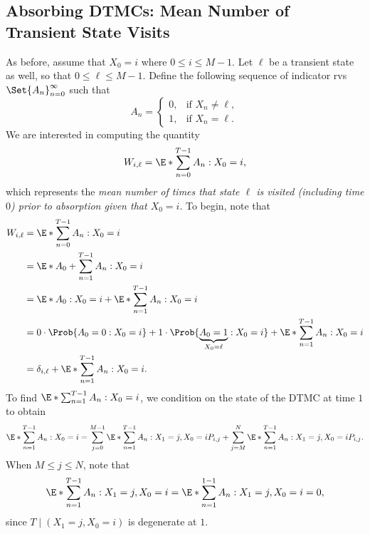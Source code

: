\subsection*{Absorbing DTMCs: Mean Number of Transient State Visits}
\begin{Regular}
    As before, assume that $X_{0}=i$ where $0 \leq i \leq M-1$. Let $\ell$ be a transient state as well, so that $0 \leq \ell \leq M-1$.
    Define the following sequence of indicator rvs $ \Set{A_n}_{n=0}^\infty $ such that
    \[ A_{n}= \begin{cases}
            0, & \text{if $X_{n} \neq \ell$}, \\
            1, & \text{if $X_{n}=\ell$}.
        \end{cases} \]
    We are interested in computing the quantity
    \[ W_{i,\ell}=\E*{\sum_{n=0}^{T-1} A_n\given X_0=i}, \]
    which represents the \emph{mean number of times that state $ \ell $ is visited (including time $0$) prior to
        absorption given that $ X_0=i $}. To begin, note that
    \begin{align*}
        W_{i, \ell}
         & =\E*{\sum_{n=0}^{T-1} A_{n} \given X_{0}=i}                                                                                                       \\
         & =\E*{A_{0}+\sum_{n=1}^{T-1} A_{n} \given X_{0}=i}                                                                                                 \\
         & =\E*{A_{0} \given X_{0}=i}+\E*{\sum_{n=1}^{T-1} A_{n} \given X_{0}=i}                                                                             \\
         & =0 \cdot \Prob{A_{0}=0 \given X_{0}=i}+1 \cdot \Prob{\underbrace{A_{0}=1}_{X_{0}=\ell} \given X_{0}=i}+\E*{\sum_{n=1}^{T-1} A_{n} \given X_{0}=i} \\
         & =\delta_{i, \ell}+\E*{\sum_{n=1}^{T-1} A_{n} \given X_{0}=i} .
    \end{align*}
    To find $\E*{\sum_{n=1}^{T-1} A_{n} \given X_{0}=i}$, we condition on the state of the DTMC at time $1$ to obtain
    \[
        \E*{\sum_{n=1}^{T-1} A_{n} \given X_{0}=i}
        =\sum_{j=0}^{M-1} \E*{\sum_{n=1}^{T-1} A_{n} \given X_{1}=j, X_{0}=i} P_{i, j}
        +\sum_{j=M}^{N} \E*{\sum_{n=1}^{T-1} A_{n} \given X_{1}=j, X_{0}=i} P_{i, j}.
    \]
    When $M \leq j \leq N$, note that
    \[
        \E*{\sum_{n=1}^{T-1} A_{n} \given X_{1}=j, X_{0}=i}=\E*{\sum_{n=1}^{1-1} A_{n} \given X_{1}=j, X_{0}=i}=0,
    \]
    since $T \mid(X_{1}=j, X_{0}=i)$ is degenerate at $1$.

\end{Regular}
